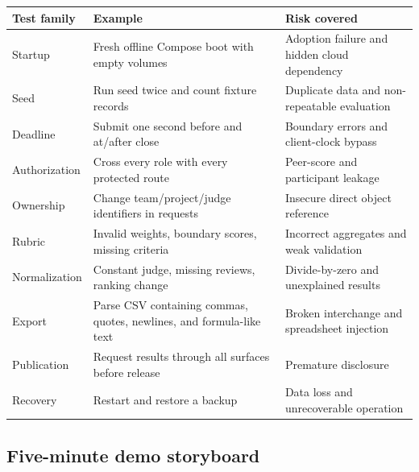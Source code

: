 \begin{longtable}{@{}L{37mm}L{52mm}L{69mm}@{}}
\toprule
\textbf{Test family} & \textbf{Example} & \textbf{Risk covered}\\
\midrule
\endhead%
Startup & Fresh offline Compose boot with empty volumes & Adoption failure and hidden cloud dependency\\
Seed & Run seed twice and count fixture records & Duplicate data and non-repeatable evaluation\\
Deadline & Submit one second before and at/after close & Boundary errors and client-clock bypass\\
Authorization & Cross every role with every protected route & Peer-score and participant leakage\\
Ownership & Change team/project/judge identifiers in requests & Insecure direct object reference\\
Rubric & Invalid weights, boundary scores, missing criteria & Incorrect aggregates and weak validation\\
Normalization & Constant judge, missing reviews, ranking change & Divide-by-zero and unexplained results\\
Export & Parse CSV containing commas, quotes, newlines, and formula-like text & Broken interchange and spreadsheet injection\\
Publication & Request results through all surfaces before release & Premature disclosure\\
Recovery & Restart and restore a backup & Data loss and unrecoverable operation\\
\bottomrule
\end{longtable}

\subsection{Five-minute demo storyboard}

